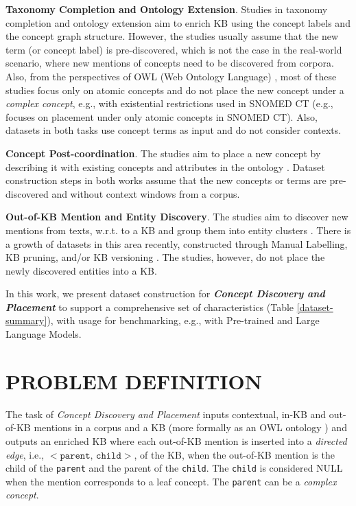 \documentclass[sigconf]{acmart}
\begin{document}
	\noindent\textbf{Taxonomy Completion and Ontology Extension}. Studies in taxonomy completion \cite{Wang2022QEN,Zeng2021,zhang2021TMN,Shen2020TaxoExpan,jurgens-pilehvar-2016-semeval} and ontology extension \cite{glauer2022interpretable} aim to enrich KB using the concept labels and the concept graph structure. However, the studies usually assume that the new term (or concept label) is pre-discovered, which is not the case in the real-world scenario, where new mentions of concepts need to be discovered from corpora. Also, from the perspectives of OWL (Web Ontology Language) \cite{GRAU2008OWL2,baader_horrocks_lutz_sattler_2017chap8}, 
	most of these studies focus only on atomic concepts and do not place the new concept under a \textit{complex concept}, e.g., with existential restrictions used in SNOMED CT (e.g., \cite{Liu2020placement} focuses on placement under only atomic concepts in SNOMED CT). Also, datasets in both tasks use concept terms as input and do not consider contexts. 
	
	\noindent\textbf{Concept Post-coordination}. The studies aim to place a new concept by describing it with existing concepts and attributes in the ontology \cite{kate2020,castell2023postcoordination}. Dataset construction steps in both works \cite{kate2020,castell2023postcoordination} assume that the new concepts or terms are pre-discovered and without context windows from a corpus. 
	
	\noindent\textbf{Out-of-KB Mention and Entity Discovery}. The studies aim to discover new mentions from texts, w.r.t. to a KB \cite{dong2023NIL,suominen2013shareclef} and group them into entity clusters \cite{Iurshina2022nilk,kassner2022edin,rizzo2017NEEL,ji2011TAC}. There is a growth of datasets in this area recently, constructed through Manual Labelling, KB pruning, and/or KB versioning \cite{dong2023NIL}. The studies, however, do not place the newly discovered entities into a KB. 
	
	In this work, we present dataset construction for \textit{\textbf{Concept Discovery and Placement}} to support a comprehensive set of characteristics (Table \ref{dataset-summary}), with usage for benchmarking, e.g., with Pre-trained and Large Language Models. 
	
	\section{PROBLEM DEFINITION}
	
	The task of \textit{Concept Discovery and Placement} inputs contextual, in-KB and out-of-KB mentions in a corpus and a KB (more formally as an OWL ontology \cite{GRAU2008OWL2,baader_horrocks_lutz_sattler_2017chap8}) and outputs an enriched KB where each out-of-KB mention is inserted into a \textit{directed edge}, i.e., $<\texttt{parent, child}>$, of the KB, when the out-of-KB mention is the child of the \texttt{parent} and the parent of the \texttt{child}. The \texttt{child} is considered NULL when the mention corresponds to a leaf concept. The \texttt{parent} can be a \textit{complex concept}. 
	
\end{document}
